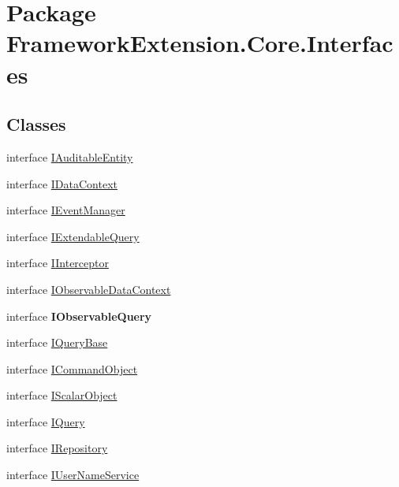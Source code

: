 \hypertarget{namespace_framework_extension_1_1_core_1_1_interfaces}{\section{Package Framework\-Extension.\-Core.\-Interfaces}
\label{namespace_framework_extension_1_1_core_1_1_interfaces}
}
\subsection*{Classes}
\begin{DoxyCompactItemize}
\item 
interface \hyperlink{interface_framework_extension_1_1_core_1_1_interfaces_1_1_i_auditable_entity}{I\-Auditable\-Entity}
\item 
interface \hyperlink{interface_framework_extension_1_1_core_1_1_interfaces_1_1_i_data_context}{I\-Data\-Context}
\item 
interface \hyperlink{interface_framework_extension_1_1_core_1_1_interfaces_1_1_i_event_manager}{I\-Event\-Manager}
\item 
interface \hyperlink{interface_framework_extension_1_1_core_1_1_interfaces_1_1_i_extendable_query}{I\-Extendable\-Query}
\item 
interface \hyperlink{interface_framework_extension_1_1_core_1_1_interfaces_1_1_i_interceptor-g}{I\-Interceptor}
\item 
interface \hyperlink{interface_framework_extension_1_1_core_1_1_interfaces_1_1_i_observable_data_context}{I\-Observable\-Data\-Context}
\item 
interface {\bfseries I\-Observable\-Query}
\item 
interface \hyperlink{interface_framework_extension_1_1_core_1_1_interfaces_1_1_i_query_base}{I\-Query\-Base}
\item 
interface \hyperlink{interface_framework_extension_1_1_core_1_1_interfaces_1_1_i_command_object}{I\-Command\-Object}
\item 
interface \hyperlink{interface_framework_extension_1_1_core_1_1_interfaces_1_1_i_scalar_object-g}{I\-Scalar\-Object}
\item 
interface \hyperlink{interface_framework_extension_1_1_core_1_1_interfaces_1_1_i_query-g}{I\-Query}
\item 
interface \hyperlink{interface_framework_extension_1_1_core_1_1_interfaces_1_1_i_repository}{I\-Repository}
\item 
interface \hyperlink{interface_framework_extension_1_1_core_1_1_interfaces_1_1_i_user_name_service}{I\-User\-Name\-Service}
\end{DoxyCompactItemize}
